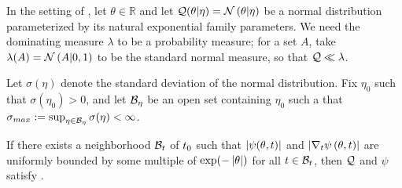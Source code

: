 \begin{lem}
%
In the setting of , let $\theta \in \mathbb{R}$ and let
$\mathcal{Q}(\theta \vert \eta) = \mathcal{N}\left(\theta \vert \eta\right)$ be a normal distribution
parameterized by its natural exponential family parameters.  We need the
dominating measure $\lambda$ to be a probability measure; for a set $A$, take
$\lambda(A) = \mathcal{N}\left(A \vert 0, 1\right)$ to be the standard normal measure, so
that $\mathcal{Q} \ll \lambda$.

Let $\sigma(\eta)$ denote the standard deviation of the normal distribution.
Fix $\eta_0$ such that $\sigma(\eta_0) > 0$, and let $\mathcal{B}_\eta$ be an open set
containing $\eta_0$ such a that $\sigma_{max} := \sup_{\eta \in \mathcal{B}_\eta}
\sigma(\eta) < \infty$.

If there exists a neighborhood $\mathcal{B}_t$ of $t_0$ such that $\left|\psi(\theta,
t)\right|$ and $\left|{\nabla_t \psi}\left(\theta, t\right)\right|$ are uniformly bounded by some multiple of
$\exp(-\left|\theta\right|)$ for all $t \in \mathcal{B}_t$, then $\mathcal{Q}$ and $\psi$ satisfy
.


\end{lem}
